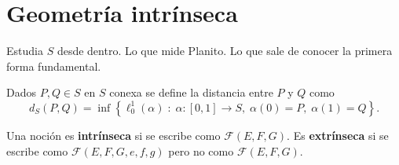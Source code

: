 \chapter{Geometría intrínseca}
Estudia $\displaystyle S $ desde dentro. Lo que mide Planito. Lo que sale de conocer la primera forma fundamental.
\begin{definition}
Dados $\displaystyle P,Q\in S $ en $\displaystyle S $ conexa se define la distancia entre $\displaystyle P $ y $\displaystyle Q $ como
\[d _{S}\left(P,Q\right)=\inf \left\{ \ell^{1}_{0}\left(\alpha \right) \; : \; \alpha: \left[0,1\right] \to S, \; \alpha\left(0\right)=P, \; \alpha\left(1\right)=Q\right\}  .\]
\end{definition}
\begin{definition}
Una noción es \textbf{intrínseca} si se escribe como $\displaystyle \mathcal{F}\left(E, F, G\right) $. Es \textbf{extrínseca} si se escribe como $\displaystyle \mathcal{F}\left(E, F, G, e, f, g\right) $ pero no como $\displaystyle \mathcal{F}\left(E, F, G\right) $. 
\end{definition}
